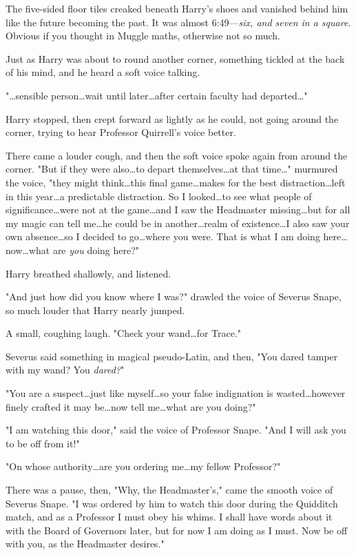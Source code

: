 The five-sided floor tiles creaked beneath Harry's shoes and vanished behind
him like the future becoming the past. It was almost 6:49—\emph{six, and seven
in a square.} Obvious if you thought in Muggle maths, otherwise not so much.

Just as Harry was about to round another corner, something tickled at the back
of his mind, and he heard a soft voice talking.

"…sensible person…wait until later…after certain faculty
had departed…"

Harry stopped, then crept forward as lightly as he could, not going around the
corner, trying to hear Professor Quirrell's voice better.

There came a louder cough, and then the soft voice spoke again from around the
corner. "But if they were also…to depart themselves…at that
time…" murmured the voice, "they might think…this final
game…makes for the best distraction…left in this year…a
predictable distraction. So I looked…to see what people of
significance…were not at the game…and I saw the Headmaster
missing…but for all my magic can tell me…he could be in
another…realm of existence…I also saw your own absence…so
I decided to go…where you were. That is what I am doing here…now…what
are \emph{you} doing here?"

Harry breathed shallowly, and listened.

"And just how did you know where I was?" drawled the voice of Severus Snape, so
much louder that Harry nearly jumped.

A small, coughing laugh. "Check your wand…for Trace."

Severus said something in magical pseudo-Latin, and then, "You dared tamper
with my wand? You \emph{dared?}"

"You are a suspect…just like myself…so your false indignation
is wasted…however finely crafted it may be…now tell me…what are you doing?"

"I am watching this door," said the voice of Professor Snape. "And I will ask
you to be off from it!"

"On whose authority…are you ordering me…my fellow Professor?"

There was a pause, then, "Why, the Headmaster's," came the smooth voice of
Severus Snape. "I was ordered by him to watch this door during the Quidditch
match, and as a Professor I must obey his whims. I shall have words about it
with the Board of Governors later, but for now I am doing as I must. Now be off
with you, as the Headmaster desires."

